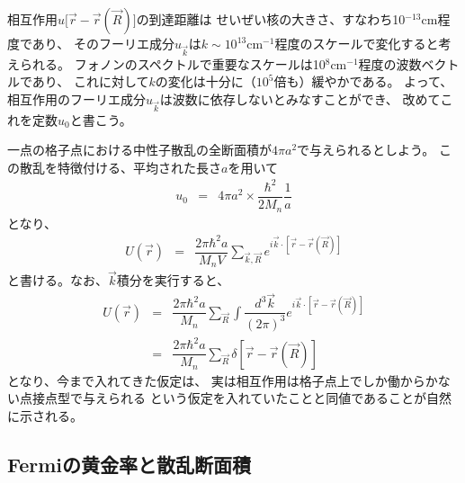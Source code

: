 \documentclass[a4j]{jsarticle}
\begin{document}
相互作用$u \big[ \vec{r} - \vec{r}(\vec{R}) \big]$の到達距離は
せいぜい核の大きさ、すなわち10$^{-13}$cm程度であり、
そのフーリエ成分$u_{\vec{k}}$は$k \sim 10^{13}$cm$^{-1}$程度のスケールで変化すると考えられる。
フォノンのスペクトルで重要なスケールは10$^{8}$cm$^{-1}$程度の波数ベクトルであり、
これに対して$k$の変化は十分に（$10^{5}$倍も）緩やかである。
よって、相互作用のフーリエ成分$u_{\vec{k}}$は波数に依存しないとみなすことができ、
改めてこれを定数$u_{0}$と書こう。

一点の格子点における中性子散乱の全断面積が$4 \pi a^{2}$で与えられるとしよう。
この散乱を特徴付ける、平均された長さ$a$を用いて
\begin{eqnarray}
	u_{0}
	&=&
	4 \pi a^{2} \times \dfrac{\hbar^{2}}{2M_{n}} \dfrac{1}{a}
\end{eqnarray}
となり、
\begin{eqnarray}
	U(\vec{r})
	&=&
	\dfrac{ 2 \pi \hbar^{2} a }{ M_{n} V }
	\sum_{ \vec{k} , \vec{R} }
	e^{i \vec{k} \cdot [ \vec{r} - \vec{r}(\vec{R}) ] }
\end{eqnarray}
と書ける。なお、$\vec{k}$積分を実行すると、
\begin{eqnarray}
	U(\vec{r})
	&=&
	\dfrac{ 2 \pi \hbar^{2} a }{ M_{n} }
	\sum_{ \vec{R} }
	\int \dfrac{d^{3} \vec{k}}{(2 \pi)^{3}}
	e^{i \vec{k} \cdot [ \vec{r} - \vec{r}(\vec{R}) ] }
	\nonumber \\[3mm] &=&
	\dfrac{ 2 \pi \hbar^{2} a }{ M_{n} }
	\sum_{ \vec{R} }
	\delta [ \vec{r} - \vec{r}(\vec{R}) ]
\end{eqnarray}
となり、今まで入れてきた仮定は、
実は相互作用は格子点上でしか働からかない点接点型で与えられる
という仮定を入れていたことと同値であることが自然に示される。

\subsection*{Fermiの黄金率と散乱断面積}
\end{document}
